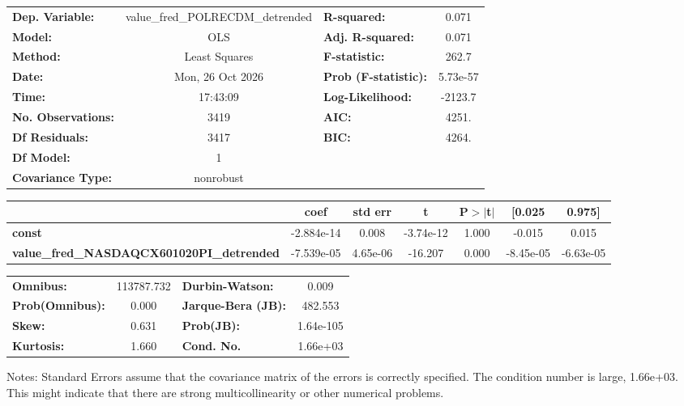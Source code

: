 \begin{center}
\begin{tabular}{lclc}
\toprule
\textbf{Dep. Variable:}                           & value\_fred\_POLRECDM\_detrended & \textbf{  R-squared:         } &     0.071   \\
\textbf{Model:}                                   &               OLS                & \textbf{  Adj. R-squared:    } &     0.071   \\
\textbf{Method:}                                  &          Least Squares           & \textbf{  F-statistic:       } &     262.7   \\
\textbf{Date:}                                    &         Mon, 26 Oct 2026         & \textbf{  Prob (F-statistic):} &  5.73e-57   \\
\textbf{Time:}                                    &             17:43:09             & \textbf{  Log-Likelihood:    } &   -2123.7   \\
\textbf{No. Observations:}                        &                3419              & \textbf{  AIC:               } &     4251.   \\
\textbf{Df Residuals:}                            &                3417              & \textbf{  BIC:               } &     4264.   \\
\textbf{Df Model:}                                &                   1              & \textbf{                     } &             \\
\textbf{Covariance Type:}                         &            nonrobust             & \textbf{                     } &             \\
\bottomrule
\end{tabular}
\begin{tabular}{lcccccc}
                                                  & \textbf{coef} & \textbf{std err} & \textbf{t} & \textbf{P$> |$t$|$} & \textbf{[0.025} & \textbf{0.975]}  \\
\midrule
\textbf{const}                                    &   -2.884e-14  &        0.008     & -3.74e-12  &         1.000        &       -0.015    &        0.015     \\
\textbf{value\_fred\_NASDAQCX601020PI\_detrended} &   -7.539e-05  &     4.65e-06     &   -16.207  &         0.000        &    -8.45e-05    &    -6.63e-05     \\
\bottomrule
\end{tabular}
\begin{tabular}{lclc}
\textbf{Omnibus:}       & 113787.732 & \textbf{  Durbin-Watson:     } &     0.009  \\
\textbf{Prob(Omnibus):} &    0.000   & \textbf{  Jarque-Bera (JB):  } &   482.553  \\
\textbf{Skew:}          &    0.631   & \textbf{  Prob(JB):          } & 1.64e-105  \\
\textbf{Kurtosis:}      &    1.660   & \textbf{  Cond. No.          } &  1.66e+03  \\
\bottomrule
\end{tabular}
\end{center}

Notes: \newline
 [1] Standard Errors assume that the covariance matrix of the errors is correctly specified. \newline
 [2] The condition number is large, 1.66e+03. This might indicate that there are \newline
 strong multicollinearity or other numerical problems.